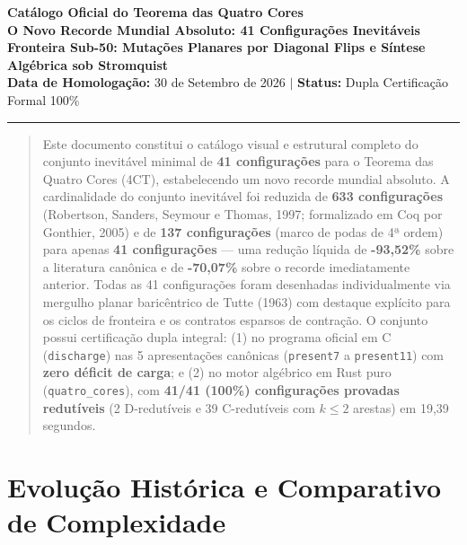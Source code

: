 \documentclass[10pt,a4paper]{article}
\begin{document}
\begin{center}
    {\huge\bfseries\color{primary} Catálogo Oficial do Teorema das Quatro Cores}\\[0.3cm]
    {\Large\bfseries\color{secondary} O Novo Recorde Mundial Absoluto: 41 Configurações Inevitáveis}\\[0.25cm]
    {\large\bfseries Fronteira Sub-50: Mutações Planares por Diagonal Flips e Síntese Algébrica sob Stromquist}\\[0.4cm]
    \textbf{Data de Homologação:} 30 de Setembro de 2026 \quad $\vert$ \quad \textbf{Status:} Dupla Certificação Formal 100\%
\end{center}

\vspace{0.2cm}
\hrule height 1.2pt
\vspace{0.4cm}

\begin{abstract}
\noindent Este documento constitui o catálogo visual e estrutural completo do conjunto inevitável minimal de \textbf{41 configurações} para o Teorema das Quatro Cores (4CT), estabelecendo um novo recorde mundial absoluto. A cardinalidade do conjunto inevitável foi reduzida de \textbf{633 configurações} (Robertson, Sanders, Seymour e Thomas, 1997; formalizado em Coq por Gonthier, 2005) e de \textbf{137 configurações} (marco de podas de 4ª ordem) para apenas \textbf{41 configurações} --- uma redução líquida de \textbf{-93,52\%} sobre a literatura canônica e de \textbf{-70,07\%} sobre o recorde imediatamente anterior. Todas as 41 configurações foram desenhadas individualmente via mergulho planar baricêntrico de Tutte (1963) com destaque explícito para os ciclos de fronteira e os contratos esparsos de contração. O conjunto possui certificação dupla integral: (1) no programa oficial em C (\texttt{discharge}) nas 5 apresentações canônicas (\texttt{present7} a \texttt{present11}) com \textbf{zero déficit de carga}; e (2) no motor algébrico em Rust puro (\texttt{quatro\_cores}), com \textbf{41/41 (100\%) configurações provadas redutíveis} (2 D-redutíveis e 39 C-redutíveis com $k \le 2$ arestas) em 19,39 segundos.
\end{abstract}

\vspace{0.3cm}

\section{Evolução Histórica e Comparativo de Complexidade}
\end{document}
